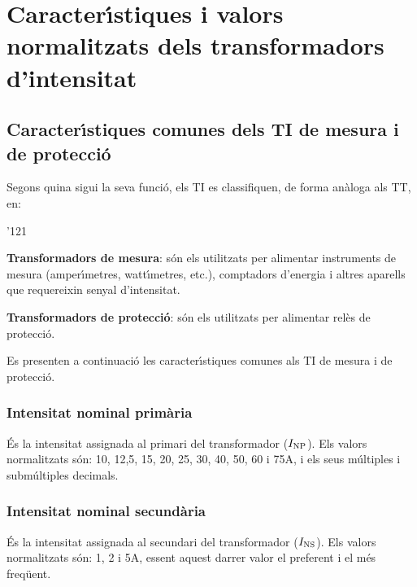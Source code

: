 \section{Caracter\'{\i}stiques i valors normalitzats dels transformadors d'intensitat}

\subsection{Caracter\'{\i}stiques comunes dels TI de mesura i de protecci\'{o}}

Segons quina sigui la seva funci\'{o}, els TI es classifiquen, de forma
an\`{a}loga als TT, en:
\begin{dinglist}{'121}
   \item \textbf{Transformadors de mesura}: s\'{o}n els utilitzats per alimentar
            instruments de mesura (amper\'{\i}metres, watt\'{\i}metres, etc.),
            comptadors d'energia i altres aparells que requereixin senyal d'intensitat.
   \item \textbf{Transformadors de protecci\'{o}}: s\'{o}n els utilitzats per
   alimentar rel\`{e}s de protecci\'{o}.
\end{dinglist}

Es presenten a continuaci\'{o} les caracter\'{\i}stiques comunes als TI de
mesura i de protecci\'{o}.

\subsubsection{Intensitat nominal prim\`{a}ria}

 \'{E}s la intensitat assignada al
primari del transformador ($I_\mathrm{NP}$).
Els valors normalitzats s\'{o}n: 10, 12,5, 15, 20, 25, 30, 40,
50, 60 i 75\unit{A}, i els seus m\'{u}ltiples i subm\'{u}ltiples decimals.

\subsubsection{Intensitat nominal secund\`{a}ria}

 \'{E}s la intensitat assignada al
secundari del transformador ($I_\mathrm{NS}$). Els valors normalitzats s\'{o}n:
1, 2 i 5\unit{A}, essent aquest darrer valor el preferent i el m\'{e}s freq\"{u}ent.

